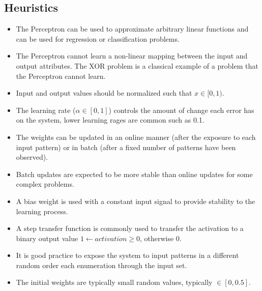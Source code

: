 \subsection{Heuristics}
\begin{itemize}
	\item The Perceptron can be used to approximate arbitrary linear functions and can be used for regression or classification problems.
	\item The Perceptron cannot learn a non-linear mapping between the input and output attributes. The XOR problem is a classical example of a problem that the Perceptron cannot learn.
	\item Input and output values should be normalized such that $x \in [0,1)$.
	\item The learning rate ($\alpha \in [0,1]$) controls the amount of change each error has on the system, lower learning rages are common such as 0.1.
	\item The weights can be updated in an online manner (after the exposure to each input pattern) or in batch (after a fixed number of patterns have been observed).
	\item Batch updates are expected to be more stable than online updates for some complex problems.
	\item A bias weight is used with a constant input signal to provide stability to the learning process. 
	\item A step transfer function is commonly used to transfer the activation to a binary output value $1 \leftarrow activation \geq 0$, otherwise $0$.
	\item It is good practice to expose the system to input patterns in a different random order each enumeration through the input set.
	\item The initial weights are typically small random values, typically $\in [0, 0.5]$.
\end{itemize}


